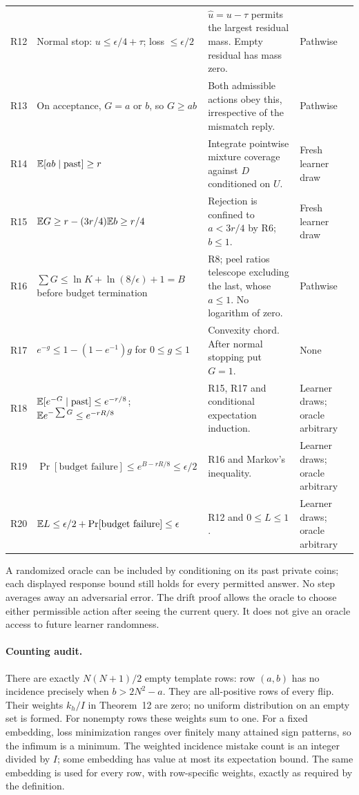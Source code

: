 \begin{longtable}{@{}p{.6cm}p{6.2cm}p{4.9cm}>{\raggedright\arraybackslash}p{2.4cm}@{}}
R12 & Normal stop: $u\le\epsilon/4+\tau$; loss $\le\epsilon/2$ & $\widehat u=u-\tau$ permits the largest residual mass. Empty residual has mass zero. & Pathwise\\
R13 & On acceptance, $G=a$ or $b$, so $G\ge ab$ & Both admissible actions obey this, irrespective of the mismatch reply. & Pathwise\\
R14 & $\mathbb E[ab\mid\text{past}]\ge r$ & Integrate pointwise mixture coverage against $D$ conditioned on $U$. & Fresh learner draw\\
R15 & $\mathbb E G\ge r-(3r/4)\mathbb E b\ge r/4$ & Rejection is confined to $a<3r/4$ by R6; $b\le1$. & Fresh learner draw\\
R16 & $\sum G\le\ln K+\ln(8/\epsilon)+1=B$ before budget termination & R8; peel ratios telescope excluding the last, whose $a\le1$. No logarithm of zero. & Pathwise\\
R17 & $e^{-g}\le1-(1-e^{-1})g$ for $0\le g\le1$ & Convexity chord. After normal stopping put $G=1$. & None\\
R18 & $\mathbb E[e^{-G}\mid\text{past}]\le e^{-r/8}$; $\mathbb E e^{-\sum G}\le e^{-rR/8}$ & R15, R17 and conditional expectation induction. & Learner draws; oracle arbitrary\\
R19 & $\Pr[\text{budget failure}]\le e^{B-rR/8}\le\epsilon/2$ & R16 and Markov's inequality. & Learner draws; oracle arbitrary\\
R20 & $\mathbb E L\le\epsilon/2+\Pr[\text{budget failure}]\le\epsilon$ & R12 and $0\le L\le1$. & Learner draws; oracle arbitrary\\
\bottomrule
\end{longtable}
\normalsize

A randomized oracle can be included by conditioning on its past private coins; each displayed response bound still holds for every permitted answer. No step averages away an adversarial error. The drift proof allows the oracle to choose either permissible action after seeing the current query. It does not give an oracle access to future learner randomness.

\paragraph{Counting audit.}
There are exactly $N(N+1)/2$ empty template rows: row $(a,b)$ has no incidence precisely when $b>2N^2-a$. They are all-positive rows of every flip. Their weights $k_h/I$ in Theorem~12 are zero; no uniform distribution on an empty set is formed. For nonempty rows these weights sum to one. For a fixed embedding, loss minimization ranges over finitely many attained sign patterns, so the infimum is a minimum. The weighted incidence mistake count is an integer divided by $I$; some embedding has value at most its expectation bound. The same embedding is used for every row, with row-specific weights, exactly as required by the definition.

